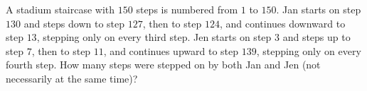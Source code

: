 A stadium staircase with $150$ steps is numbered from $1$ to $150$. Jan starts on step $130$ and steps down to step $127$, then to step $124$, and continues downward to step $13$, stepping only on every third step. Jen starts on step $3$ and steps up to step $7$, then to step $11$, and continues upward to step $139$, stepping only on every fourth step. How many steps were stepped on by both Jan and Jen (not necessarily at the same time)?
